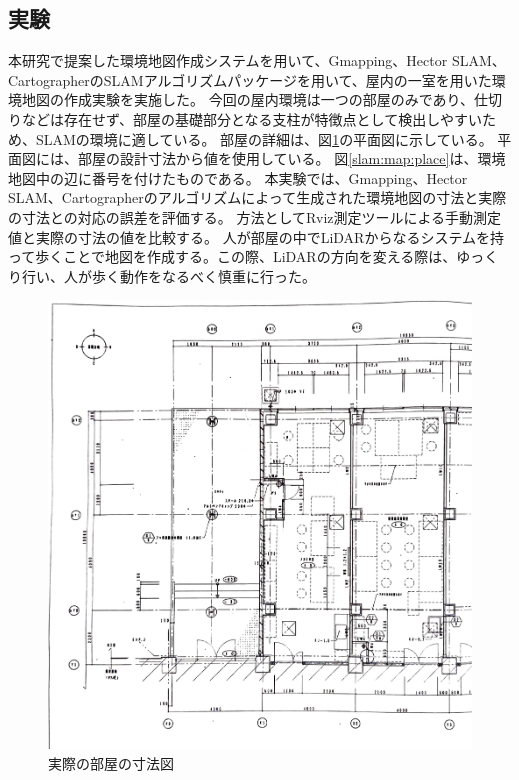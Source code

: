 \subsection{実験}
本研究で提案した環境地図作成システムを用いて、Gmapping、Hector SLAM、CartographerのSLAMアルゴリズムパッケージを用いて、屋内の一室を用いた環境地図の作成実験を実施した。
今回の屋内環境は一つの部屋のみであり、仕切りなどは存在せず、部屋の基礎部分となる支柱が特徴点として検出しやすいため、SLAMの環境に適している。
部屋の詳細は、図\ref{slam:map:measure}の平面図に示している。
平面図には、部屋の設計寸法から値を使用している。
図\ref{slam:map:place}は、環境地図中の辺に番号を付けたものである。
本実験では、Gmapping、Hector SLAM、Cartographerのアルゴリズムによって生成された環境地図の寸法と実際の寸法との対応の誤差を評価する。
方法としてRviz測定ツールによる手動測定値と実際の寸法の値を比較する。
人が部屋の中でLiDARからなるシステムを持って歩くことで地図を作成する。この際、LiDARの方向を変える際は、ゆっくり行い、人が歩く動作をなるべく慎重に行った。
\begin{figure}[h]
  \begin{center}
  \includegraphics[width=.8\linewidth]{img/slam_31.pdf}
  \caption{実際の部屋の寸法図}
  \label{slam:map:measure}
  \end{center}
\end{figure}


